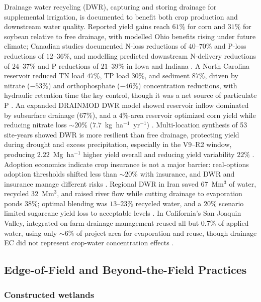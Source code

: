 \documentclass[11pt]{article}
\begin{document}
Drainage water recycling (DWR), capturing and storing drainage for
supplemental irrigation, is documented to benefit both crop production and
downstream water quality. Reported yield gains reach $61\%$ for corn and
$31\%$ for soybean relative to free drainage, with modelled Ohio benefits
rising under future climate; Canadian studies documented N-loss reductions
of $40$--$70\%$ and P-loss reductions of $12$--$36\%$, and modelling
predicted downstream N-delivery reductions of $24$--$37\%$ and P reductions
of $21$--$39\%$ in Iowa and Indiana \parencite{Hay2021}. A North Carolina
reservoir reduced TN load $47\%$, TP load $30\%$, and sediment $87\%$,
driven by nitrate ($-53\%$) and orthophosphate ($-46\%$) concentration
reductions, with hydraulic retention time the key control, though it was a
net source of particulate P \parencite{Moursi2023}. An expanded DRAINMOD
DWR model showed reservoir inflow dominated by subsurface drainage
($67\%$), and a $4\%$-area reservoir optimized corn yield while reducing
nitrate loss $\sim20\%$ ($7.7$~kg~ha$^{-1}$~yr$^{-1}$)
\parencite{Moursi2022}. Multi-location synthesis of 53 site-years showed
DWR is more resilient than free drainage, protecting yield during drought
and excess precipitation, especially in the V9--R2 window, producing
$2.22$~Mg~ha$^{-1}$ higher yield overall and reducing yield variability
$22\%$ \parencite{Willison2021}. Adoption economics indicate crop insurance
is not a major barrier: real-options adoption thresholds shifted less than
$\sim20\%$ with insurance, and DWR and insurance manage different risks
\parencite{Sellars2022}. Regional DWR in Iran saved $67$~Mm$^3$ of water,
recycled $32$~Mm$^3$, and raised river flow while cutting drainage to
evaporation ponds $38\%$; optimal blending was $13$--$23\%$ recycled water,
and a $20\%$ scenario limited sugarcane yield loss to acceptable levels
\parencite{Kosari2024}. In California's San Joaquin Valley, integrated
on-farm drainage management reused all but $0.7\%$ of applied water, using
only $\sim6\%$ of project area for evaporation and reuse, though drainage
EC did not represent crop-water concentration effects
\parencite{Ayars2014}.

\subsection{Edge-of-Field and Beyond-the-Field Practices}

\subsubsection{Constructed wetlands}
\end{document}
